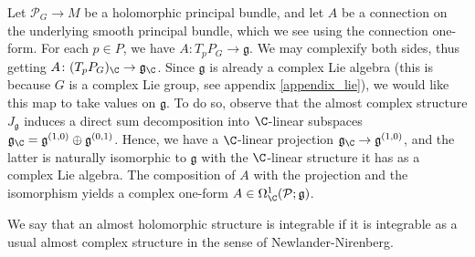 Let \(\mathcal{P}_G \to M\) be a holomorphic principal bundle, and let \(A\) be a connection on the underlying smooth principal bundle, which we see using the connection one-form. For each \(p\in P\), we have \(A\colon T_pP_G \to \mathfrak{g}\). We may complexify both sides, thus getting \(A\colon (T_pP_G)_\C \to \mathfrak{g}_\C\). Since \(\mathfrak{g}\) is already a complex Lie algebra (this is because \(G\) is a complex Lie group, see appendix \ref{appendix_lie}), we would like this map to take values on \(\mathfrak{g}\). To do so, observe that the almost complex structure \(J_{\mathfrak{g}}\) induces a direct sum decomposition into \(\C\)-linear subspaces \(\mathfrak{g}_\C=\mathfrak{g}^{(1,0)}\oplus \mathfrak{g}^{(0,1)}\). Hence, we have a \(\C\)-linear projection \(\mathfrak{g}_\C\to \mathfrak{g}^{(1,0)}\), and the latter is naturally isomorphic to \(\mathfrak{g}\) with the \(\C\)-linear structure it has as a complex Lie algebra. The composition of \(A\) with the projection and the isomorphism yields a complex one-form \(A\in \Omega_\C^1(\mathcal{P}; \mathfrak{g})\).

We say that an almost holomorphic structure is integrable if it is integrable as a usual almost complex structure in the sense of Newlander-Nirenberg. \newline

